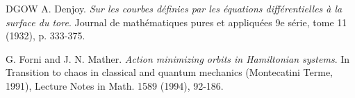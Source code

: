 \documentclass{amsart}
\newcounter{item}[section]
\theoremstyle{definition}
\newcommand{\T}{\mathbb{T}}
\begin{document}
\begin{thebibliography}{DGOW}
			 A. Denjoy. {\it Sur les courbes d\'{e}finies par les \'{e}quations diff\'{e}rentielles
				\`{a} la surface du tore}.
			Journal de math\'{e}matiques pures et appliqu\'{e}es 9e
			s\'{e}rie, tome 11 (1932), p. 333-375.
			
			
			
			
			
			
			
			
			
			
			
			
			 G. Forni and J. N. Mather. {\it Action minimizing orbits in
				Hamiltonian systems}. In Transition to chaos in classical and
			quantum mechanics (Montecatini Terme, 1991), Lecture Notes in Math.
			{1589} (1994), 92-186.
			

\end{thebibliography}
\end{document}
